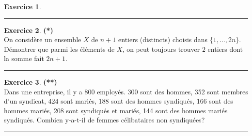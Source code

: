 \documentclass[a4paper,11pt]{article}
\theoremstyle{definition}
\newtheorem{exo}{Exercice} %
\begin{document}
\begin{minipage}{1\linewidth}
\begin{minipage}[t]{0.48\linewidth}
\begin{exo}
\centering\rule{1\linewidth}{0.6pt}\end{exo}

\begin{exo}\textbf{(*)}\quad\\[0.2cm]
On considère un ensemble $X$ de $n+1$ entiers (distincts) choisis dans $\{1,\dots,2n\}$. Démontrer que parmi les éléments de $X$, on peut toujours trouver $2$ entiers dont la somme fait $2n+1$.

\centering\rule{1\linewidth}{0.6pt}\end{exo}


\begin{exo}\textbf{(**)}\quad\\[0.2cm]
Dans une entreprise, il y a 800 employés. 300 sont des hommes, 352 sont membres d'un syndicat, 424 sont mariés, 188 sont des hommes syndiqués, 166 sont des hommes mariés, 208 sont syndiqués et mariés, 144 sont des hommes mariés syndiqués. Combien y-a-t-il de femmes célibataires non syndiquées?

\centering\rule{1\linewidth}{0.6pt}\end{exo}



\end{minipage}\end{minipage} \newpage
\end{document}
